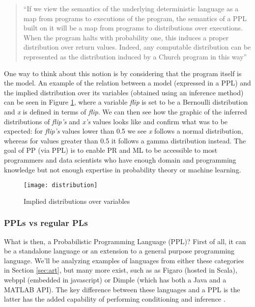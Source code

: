 \begin{quote}
  ``If we view the semantics of the underlying deterministic language as a map
  from programs to executions of the program, the semantics of a PPL built on it
   will be a map from programs to distributions over executions. When the
   program halts with probability one, this induces a proper distribution over
   return values. Indeed, any computable distribution can be represented as the
   distribution induced by a Church program in this way''~\cite{Freer2012}
\end{quote}

One way to think about this notion is by considering that the program itself
is the model. An example of the relation between a model (expressed in a PPL)
and the implied distribution over its variables (obtained using an inference
method) can be seen in Figure \ref{fig:distribution}, where a variable \textit{flip}
is set to be a Bernoulli distribution and \textit{x} is defined in terms of
\textit{flip}. We can then see how the graphic of the inferred distributions
of \textit{flip's} and \textit{x's} values looks like and confirm what was to
be expected: for \textit{flip's} values lower than 0.5 we see \textit{x} follows
a normal distribution, whereas for values greater than 0.5 it follows a gamma
distribution instead.
 The goal of PP (via PPL) is to enable PR and ML to be accessible to
most programmers and data scientists who have enough domain and programming
knowledge but not enough expertise in probability theory or machine learning.

\begin{figure}[t]
  \begin{center}
    \leavevmode
    \texttt{[image: distribution]}
    \caption{Implied distributions over variables \cite{intpp}}
    \label{fig:distribution}
  \end{center}
\end{figure}

\subsubsection{PPLs vs regular PLs}

What is then, a Probabilistic Programming Language (PPL)? First of all, it can
be a standalone language or an extension to a general purpose programming language.
We'll be analyzing examples of languages from either these categories in Section
\ref{sec:art}, but many more exist, such as as Figaro \cite{figaro} (hosted in Scala),
webppl \cite{dippl} (embedded in javascript) or Dimple
\cite{DBLP:journals/corr/abs-1212-2991} (which has both a Java and a MATLAB API).
The key difference between these languages and a PPL is the latter has
the added capability of performing conditioning and inference \cite{Andrieu2003}.


